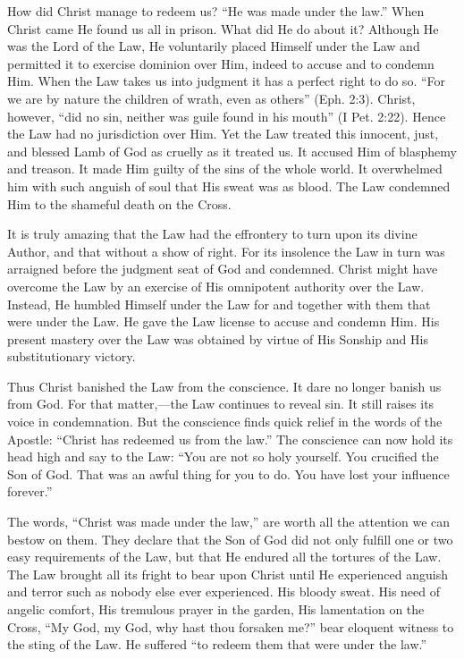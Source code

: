 How did Christ manage to redeem us? “He was made under the law.” When Christ came He found us all in prison. What did He do about it? Although He was the Lord of the Law, He voluntarily placed Himself under the Law and permitted it to exercise dominion over Him, indeed to accuse and to condemn Him. When the Law takes us into judgment it has a perfect right to do so. “For we are by nature the children of wrath, even as others” (Eph. 2:3). Christ, however, “did no sin, neither was guile found in his mouth” (I Pet. 2:22). Hence the Law had no jurisdiction over Him. Yet the Law treated this innocent, just, and blessed Lamb of God as cruelly as it treated us. It accused Him of blasphemy and treason. It made Him guilty of the sins of the whole world. It overwhelmed him with such anguish of soul that His sweat was as blood. The Law condemned Him to the shameful death on the Cross.

It is truly amazing that the Law had the effrontery to turn upon its divine Author, and that without a show of right. For its insolence the Law in turn was arraigned before the judgment seat of God and condemned. Christ might have overcome the Law by an exercise of His omnipotent authority over the Law. Instead, He humbled Himself under the Law for and together with them that were under the Law. He gave the Law license to accuse and condemn Him. His present mastery over the Law was obtained by virtue of His Sonship and His substitutionary victory.

Thus Christ banished the Law from the conscience. It dare no longer banish us from God. For that matter,—the Law continues to reveal sin. It still raises its voice in condemnation. But the conscience finds quick relief in the words of the Apostle: “Christ has redeemed us from the law.” The conscience can now hold its head high and say to the Law: “You are not so holy yourself. You crucified the Son of God. That was an awful thing for you to do. You have lost your influence forever.”

The words, “Christ was made under the law,” are worth all the attention we can bestow on them. They declare that the Son of God did not only fulfill one or two easy requirements of the Law, but that He endured all the tortures of the Law. The Law brought all its fright to bear upon Christ until He experienced anguish and terror such as nobody else ever experienced. His bloody sweat. His need of angelic comfort, His tremulous prayer in the garden, His lamentation on the Cross, “My God, my God, why hast thou forsaken me?” bear eloquent witness to the sting of the Law. He suffered “to redeem them that were under the law.”

